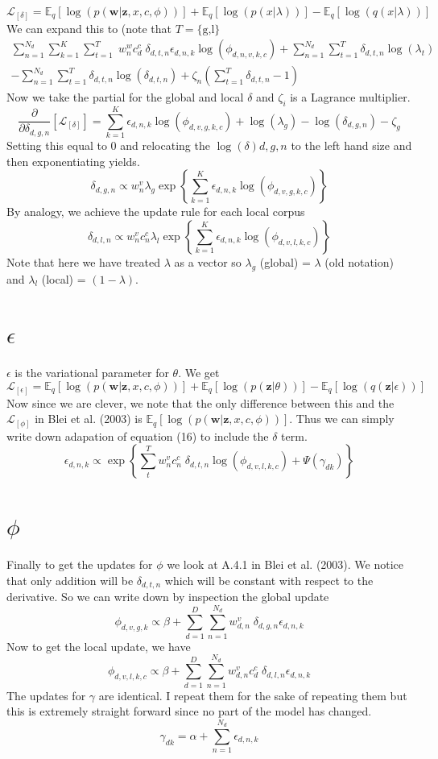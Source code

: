 \documentclass[11pt,a4paper]{article}
\begin{document}
$$
\mathcal{L}_{[\delta]} = \mathbb{E}_q\left[ \log(p(\mathbf{w}|\mathbf{z},x,c,\phi )) \right] + \mathbb{E}_q\left[\log(p(x|\lambda))\right] - \mathbb{E}_q\left[\log(q(x|\lambda))\right]
$$
We can expand this to (note that $T =\{\text{g,l}\}$
\begin{multline*}
\sum_{n=1}^{N_d} \sum_{k=1}^K \sum_{t=1}^T \;w_n^w c_d^c \;\delta_{d,t,n} \epsilon_{d,n,k} \log(\phi_{d,n,v,k,c}) + \sum_{n=1}^{N_d} \sum_{t=1}^T \delta_{d,t,n}\log(\lambda_t) \\ - \sum_{n=1}^{N_d}\sum_{t=1}^T \delta_{d,t,n}\log(\delta_{d,t,n}) + \zeta_n(\sum_{t=1}^T\delta_{d,t,n} - 1)
\end{multline*}
Now we take the partial for the global and local $\delta$ and $\zeta_i$ is a Lagrance multiplier.
$$
\frac{\partial}{\partial \delta_{d,g,n}}\left[ \mathcal{L}_{[\delta]}\right] = \sum_{k=1}^K \epsilon_{d,n,k} \log(\phi_{d,v,g,k,c}) + \log(\lambda_g) - \log(\delta_{d,g,n}) - \zeta_g
$$
Setting this equal to 0 and relocating the $\log(\delta){d,g,n}$ to the left hand size and then exponentiating yields.
$$
\delta_{d,g,n} \propto w_n^v \lambda_g \exp\left\{ \sum_{k=1}^K \epsilon_{d,n,k} \log(\phi_{d,v,g,k,c})  \right\}
$$
By analogy, we achieve the update rule for each local corpus
$$
\delta_{d,l,n} \propto  w_n^v c_n^c \lambda_l \exp\left\{ \sum_{k=1}^K \epsilon_{d,n,k} \log(\phi_{d,v,l,k,c})  \right\}
$$
Note that here we have treated $\lambda$ as a vector so $\lambda_g$ (global) = $\lambda$ (old notation) and $\lambda_l$ (local) = $(1 - \lambda)$. 
\section*{$\epsilon$}
$\epsilon$ is the variational parameter for $\theta$. We get
$$
\mathcal{L}_{[\epsilon]} =  \mathbb{E}_q\left[ \log(p(\mathbf{w}|\mathbf{z},x,c,\phi)) \right] + \mathbb{E}_q\left[\log(p(\mathbf{z}|\theta))\right] - \mathbb{E}_q\left[\log(q(\mathbf{z}|\epsilon))\right] 
$$
Now since we are clever, we note that the only difference between this and the $\mathcal{L}_{[\phi]}$ in Blei et al. (2003) is $\mathbb{E}_q\left[ \log(p(\mathbf{w}|\mathbf{z},x,c,\phi)) \right]$. Thus we can simply write down adapation of equation (16) to include the $\delta$ term.
$$
\epsilon_{d,n,k} \propto \exp\left\{\sum_t^T w_n^v c_n^c \; \delta_{d,t,n} \log(\phi_{d,v,l,k,c}) + \Psi(\gamma_{dk}) 
\right\}
$$
\section*{$\phi$}
Finally to get the updates for $\phi$ we look at A.4.1 in Blei et al. (2003). We notice that only addition will be $\delta_{d,t,n}$ which will be constant with respect to the derivative. So we can write down by inspection the global update
$$
\phi_{d,v,g,k} \propto \beta + \sum_{d=1}^D\sum_{n=1}^{N_d} w_{d,n}^v \; \delta_{d,g,n} \epsilon_{d,n,k}
$$
Now to get the local update, we have
$$
\phi_{d,v,l,k,c} \propto \beta +  \sum_{d=1}^D\sum_{n=1}^{N_d} w_{d,n}^v c_{d}^c\; \delta_{d,l,n} \epsilon_{d,n,k}
$$
The updates for $\gamma$ are identical. I repeat them for the sake of repeating them but this is extremely straight forward since no part of the model has changed.
$$
\gamma_{dk} = \alpha + \sum_{n=1}^{N_d} \epsilon_{d,n,k}
$$ 
	
\end{document}
